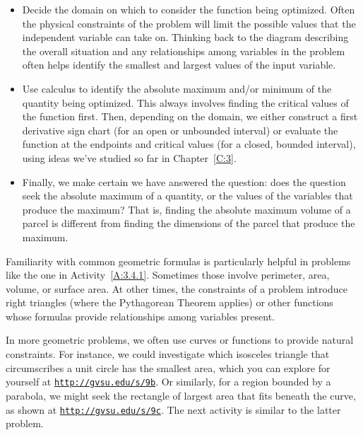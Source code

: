 \begin{itemize}
	\item Decide the domain on which to consider the function being optimized.  Often the physical constraints of the problem will limit the possible values that the independent variable can take on.  Thinking back to the diagram describing the overall situation and any relationships among variables in the problem often helps identify the smallest and largest values of the input variable.
	\item Use calculus to identify the absolute maximum and/or minimum of the quantity being optimized.  This always involves finding the critical values of the function first.  Then, depending on the domain, we either construct a first derivative sign chart (for an open or unbounded interval) or evaluate the function at the endpoints and critical values (for a closed, bounded interval), using ideas we've studied so far in Chapter~\ref{C:3}.
	\item Finally, we make certain we have answered the question:  does the question seek the absolute maximum of a quantity, or the values of the variables that produce the maximum?  That is, finding the absolute maximum volume of a parcel is different from finding the dimensions of the parcel that produce the maximum.
\end{itemize}



Familiarity with common geometric formulas is particularly helpful in problems like the one in Activity~\ref{A:3.4.1}.  Sometimes those involve perimeter, area, volume, or surface area.  At other times, the constraints of a problem introduce right triangles (where the Pythagorean Theorem applies) or other functions whose formulas provide relationships among variables present.



In more geometric problems, we often use curves or functions to provide natural constraints.  For instance, we could investigate which isosceles triangle that circumscribes a unit circle has the smallest area, which you can explore for yourself at \href{http://gvsu.edu/s/9b}{\texttt{http://gvsu.edu/s/9b}}.  Or similarly, for a region bounded by a parabola, we might seek the rectangle of largest area that fits beneath the curve, as shown at \href{http://gvsu.edu/s/9c}{\texttt{http://gvsu.edu/s/9c}}.  The next activity is similar to the latter problem.





